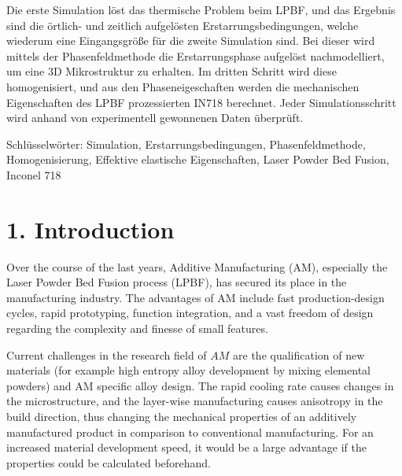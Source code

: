\documentclass[10pt]{article}
\begin{document}
Die erste Simulation löst das thermische Problem beim LPBF, und das Ergebnis sind die örtlich- und zeitlich aufgelösten Erstarrungsbedingungen, welche wiederum eine Eingangsgröße für die zweite Simulation sind. Bei dieser wird mittels der Phasenfeldmethode die Erstarrungsphase aufgelöst nachmodelliert, um eine 3D Mikrostruktur zu erhalten. Im dritten Schritt wird diese homogenisiert, und aus den Phaseneigeschaften werden die mechanischen Eigenschaften des LPBF prozessierten IN718 berechnet. Jeder Simulationsschritt wird anhand von experimentell gewonnenen Daten überprüft.

Schlüsselwörter: Simulation, Erstarrungsbedingungen, Phasenfeldmethode, Homogenisierung, Effektive elastische Eigenschaften, Laser Powder Bed Fusion, Inconel 718

\section*{1. Introduction}
Over the course of the last years, Additive Manufacturing (AM), especially the Laser Powder Bed Fusion process (LPBF), has secured its place in the manufacturing industry. The advantages of AM include fast production-design cycles, rapid prototyping, function integration, and a vast freedom of design regarding the complexity and finesse of small features.

Current challenges in the research field of $A M$ are the qualification of new materials (for example high entropy alloy development by mixing elemental powders) and AM specific alloy design. The rapid cooling rate causes changes in the microstructure, and the layer-wise manufacturing causes anisotropy in the build direction, thus changing the mechanical properties of an additively manufactured product in comparison to conventional manufacturing. For an increased material development speed, it would be a large advantage if the properties could be calculated beforehand.
\end{document}
